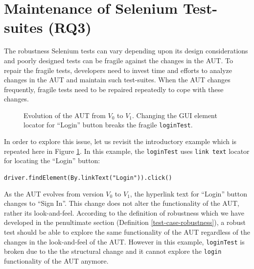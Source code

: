 

\section{Maintenance of Selenium Test-suites (RQ3)}
\label{locatorMaintenance}
The robustness Selenium tests can vary depending upon its design considerations and poorly designed tests can be fragile against the changes in the AUT. To repair the fragile tests, developers need to invest time and efforts to analyze changes in the AUT and maintain such test-suites. When the AUT changes frequently, fragile tests need to be repaired repeatedly to cope with these changes. 

\begin{figure}[ht!]
\centering     %
{}
\vspace{-2mm}
  \captionsetup{justification=justified,
singlelinecheck=false}
\caption{Evolution of the AUT from $V_{0}$ to $V_{1}$. Changing the GUI element locator for ``Login'' button breaks the fragile \texttt{loginTest}.}
\label{fig:3loginTest}
\end{figure} 

In order to explore this issue, let us revisit the introductory example which is repeated here in Figure \ref{fig:3loginTest}. In this example, the \texttt{loginTest} uses \texttt{link text} locator for locating the ``Login'' button: \begin{small}
\texttt{driver.findElement(By.linkText("Login")).click()}
\end{small}
As the AUT evolves from version $V_{0}$ to $V_{1}$, the hyperlink text for ``Login'' button changes to ``Sign In''. This change does not alter the functionality of the AUT, rather its look-and-feel. According to the definition of robustness which we have developed in the penultimate section (Definition \ref{test-case-robustness}), a robust test should be able to explore the same functionality of the AUT regardless of the changes in the look-and-feel of the AUT. However in this example, \texttt{loginTest} is broken due to the the structural change and it cannot explore the \texttt{login} functionality of the AUT anymore. 

